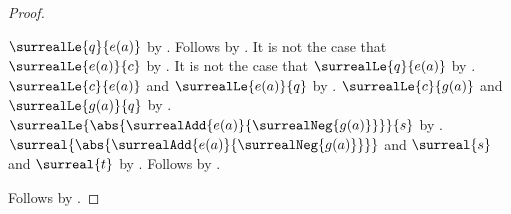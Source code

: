 \begin{proof}
\begin{subproof}
\begin{byCase}
\begin{byCase}
                $\surrealLe{q}{e(a)}$
                    by .
                Follows by .
                It is not the case that $\surrealLe{e(a)}{c}$
                    by .
                It is not the case that $\surrealLe{q}{e(a)}$
                    by .
                $\surrealLe{c}{e(a)}$ and $\surrealLe{e(a)}{q}$
                    by
                    .
                $\surrealLe{c}{g(a)}$ and $\surrealLe{g(a)}{q}$
                    by \auto.
                $\surrealLe{
                    \abs{\surrealAdd{e(a)}{\surrealNeg{g(a)}}}}{s}$
                    by .
                $\surreal{
                    \abs{\surrealAdd{e(a)}{\surrealNeg{g(a)}}}}$ and
                    $\surreal{s}$ and $\surreal{t}$
                    by
                    .
                Follows by .
            \end{byCase}
        \end{byCase}
    \end{subproof}
    Follows by \auto.
\end{proof}
